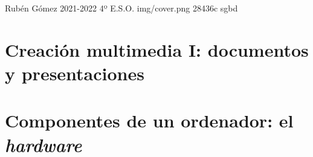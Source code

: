 \documentclass{\ClassPath/yukibook}
\begin{document}
    {Rubén Gómez}  %
    {2021-2022}    %
    {4º E.S.O.} %
    {} %
    {} %
    {img/cover.png} %
    {28436c}
    {sgbd} %

    \coverpage
    \licensepage

    \tableofcontents

    \graphicspath{{img/tic/}}

    \part{Creación multimedia I: documentos y presentaciones}

    

    \part{Componentes de un ordenador: el \textit{hardware}}
\end{document}
